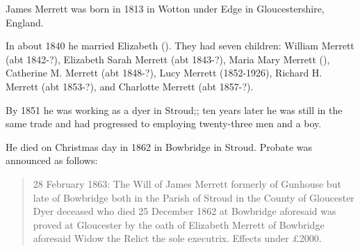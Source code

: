 
James Merrett\cite{HH-MMM-marriage} was born in 1813 in Wotton under Edge in Gloucestershire, England.

In about 1840 he married Elizabeth (). They had seven children: William Merrett (abt 1842-?), Elizabeth Sarah Merrett (abt 1843-?), Maria Mary Merrett (), Catherine M. Merrett (abt 1848-?), Lucy Merrett (1852-1926), Richard H. Merrett (abt 1853-?), and Charlotte Merrett (abt 1857-?). 

By 1851 he was working as a dyer in Stroud;\cite{Census1851Merrett}; ten years later he was still in the same trade and had progressed to employing twenty-three men and a boy.\cite{Census1861Merrett}

He died on Christmas day in 1862 in Bowbridge in Stroud. Probate was announced as follows:\cite{JamesMerrettProbate}

\begin{quotation}
28 February 1863: The Will of James Merrett formerly of Gunhouse but late of Bowbridge both in the Parish of Stroud in the County of Gloucester Dyer deceased who died 25 December 1862 at Bowbridge aforesaid was proved at Gloucester by the oath of Elizabeth Merrett of Bowbridge aforesaid Widow the Relict the sole executrix. Effects under \pounds2000.
\end{quotation}
